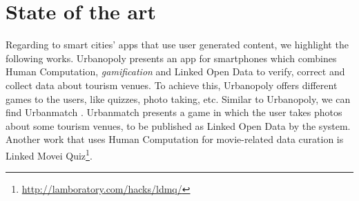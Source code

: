 \section{State of the art}
\label{sec:state_of_the_art}

Regarding to smart cities' apps that use user generated content, we highlight the following works. Urbanopoly \cite{celino_urbanopolysocial_2012} presents an app for smartphones which combines Human Computation, \textit{gamification} and Linked Open Data to verify, correct and collect data about tourism venues. To achieve this, Urbanopoly offers different games to the users, like quizzes, photo taking, etc. Similar to Urbanopoly, we can find Urbanmatch \cite{celino_urbanmatch-linking_2012}. Urbanmatch presents a game in which the user takes photos about some tourism venues, to be published as Linked Open Data by the system. Another work that uses Human Computation for movie-related data curation is Linked Movei Quiz\footnote{\url{http://lamboratory.com/hacks/ldmq/}}.
